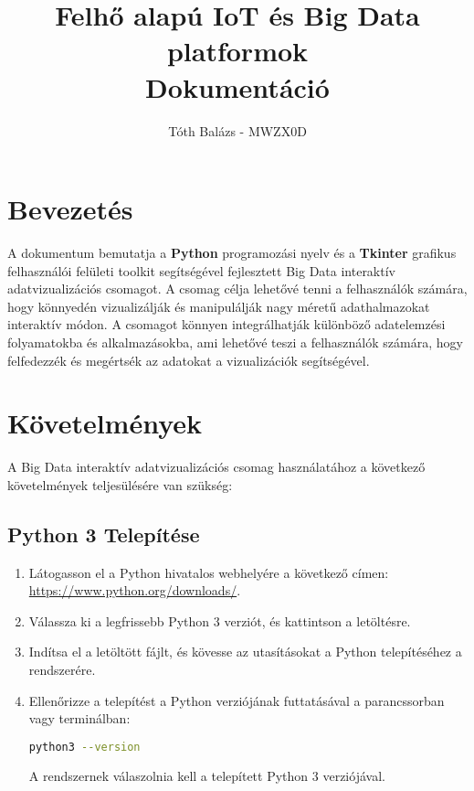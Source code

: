 \documentclass{article}
\date{}
\begin{document}
\title{Felhő alapú IoT és Big Data platformok\\ \small Dokumentáció}
\author{Tóth Balázs - MWZX0D}
\maketitle

\renewcommand{\contentsname}{Tartalomjegyzék}

\tableofcontents
\clearpage

\section{Bevezetés}
A dokumentum bemutatja a \textbf{Python} programozási nyelv és a \textbf{Tkinter} grafikus felhasználói felületi toolkit segítségével fejlesztett Big Data interaktív adatvizualizációs csomagot. A csomag célja lehetővé tenni a felhasználók számára, hogy könnyedén vizualizálják és manipulálják nagy méretű adathalmazokat interaktív módon. A csomagot könnyen integrálhatják különböző adatelemzési folyamatokba és alkalmazásokba, ami lehetővé teszi a felhasználók számára, hogy felfedezzék és megértsék az adatokat a vizualizációk segítségével.

\section{Követelmények}
A Big Data interaktív adatvizualizációs csomag használatához a következő követelmények teljesülésére van szükség:

\subsection{Python 3 Telepítése}
\begin{enumerate}
    \item Látogasson el a Python hivatalos webhelyére a következő címen: \url{https://www.python.org/downloads/}.
    \item Válassza ki a legfrissebb Python 3 verziót, és kattintson a letöltésre.
    \item Indítsa el a letöltött fájlt, és kövesse az utasításokat a Python telepítéséhez a rendszerére.
    \item Ellenőrizze a telepítést a Python verziójának futtatásával a parancssorban vagy terminálban:
    \begin{lstlisting}[language=bash]
    python3 --version
    \end{lstlisting}
    A rendszernek válaszolnia kell a telepített Python 3 verziójával.
\end{enumerate}
\end{document}
